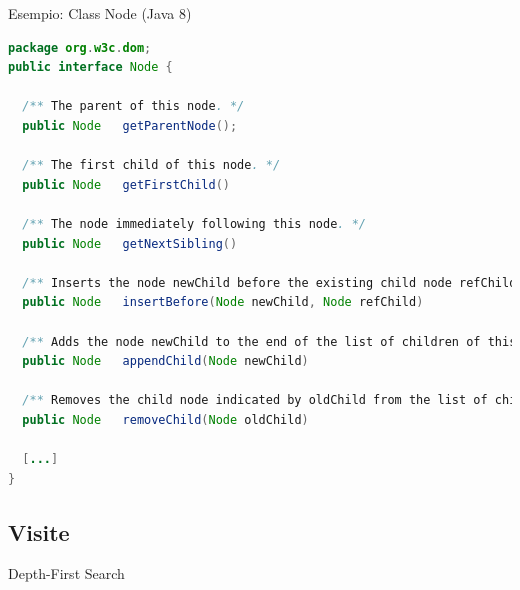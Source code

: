\begin{frame}[fragile]{Esempio: Class Node (Java 8)}

\scriptsize

\vspace{-12pt}
\begin{lstlisting}[language=java]
package org.w3c.dom;
public interface Node {

  /** The parent of this node. */
  public Node	getParentNode();

  /** The first child of this node. */
  public Node	getFirstChild()

  /** The node immediately following this node. */
  public Node	getNextSibling()

  /** Inserts the node newChild before the existing child node refChild. */
  public Node	insertBefore(Node newChild, Node refChild)

  /** Adds the node newChild to the end of the list of children of this node. */
  public Node	appendChild(Node newChild)

  /** Removes the child node indicated by oldChild from the list of children. */
  public Node	removeChild(Node oldChild)

  [...]
}
\end{lstlisting}
\end{frame}


\subsection{Visite}

\begin{frame}{Depth-First Search}
	

\end{frame}


